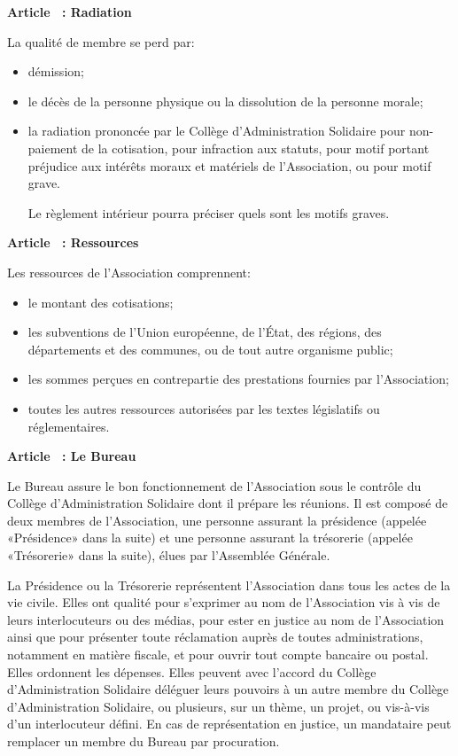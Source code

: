 \documentclass [11pt]{article}
\renewcommand {\section}[1]{\stepcounter {section}%
{\vspace {1em}\noindent\Large \bf Article \thesection\ : #1 \par}}
\begin{document}
\section {Radiation}

La qualité de membre se perd par:
\begin {itemize}
\item
démission;
\item
le décès de la personne physique ou la dissolution de la personne morale;
\item
la radiation prononcée par le Collège d'Administration Solidaire pour
non-paie\-ment de la cotisation, pour infraction aux statuts, pour motif
portant préjudice aux intérêts moraux et matériels de l'Association, ou pour
motif grave.

Le règlement intérieur pourra préciser quels sont les motifs graves.
\end {itemize}


\section {Ressources}

Les ressources de l'Association comprennent:
\begin {itemize}
\item
le montant des cotisations;
\item
les subventions de l'Union européenne, de l'État, des régions, des
départements et des communes, ou de tout autre organisme public;
\item
les sommes perçues en contrepartie des prestations fournies par
l'Association;
\item
toutes les autres ressources autorisées par les textes législatifs ou
réglementaires.
\end {itemize}


\newpage
\section {Le Bureau}

Le Bureau assure le bon fonctionnement de l'Association sous le contrôle
du Collège d'Administration Solidaire dont il prépare les réunions.
Il est composé de deux membres de l'Association, une personne assurant la
présidence (appelée «Présidence» dans la suite) et une personne assurant la
trésorerie (appelée «Trésorerie» dans la suite), élues par l'Assemblée
Générale.

La Présidence ou la Trésorerie représentent l'Association dans tous les actes
de la vie civile. Elles ont qualité pour s'exprimer au nom de l'Association
vis à vis de leurs interlocuteurs ou des médias, pour ester en justice
au nom de l'Association ainsi que pour présenter toute réclamation
auprès de toutes administrations, notamment en matière fiscale, et pour
ouvrir tout compte bancaire ou postal. Elles ordonnent les dépenses.
Elles peuvent avec l'accord du Collège d'Administration Solidaire déléguer
leurs pouvoirs à un autre membre du Collège d'Administration Solidaire,
ou plusieurs, sur un thème, un projet, ou vis-à-vis d'un interlocuteur défini.
En cas de représentation en justice, un mandataire peut remplacer
un membre du Bureau par procuration.
\end{document}
